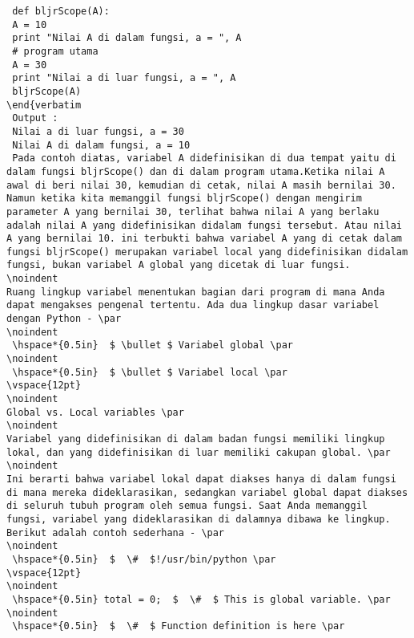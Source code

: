 \begin{verbatim}
 def bljrScope(A):
 A = 10
 print "Nilai A di dalam fungsi, a = ", A
 # program utama
 A = 30
 print "Nilai a di luar fungsi, a = ", A
 bljrScope(A)
\end{verbatim
 Output :
 Nilai a di luar fungsi, a = 30
 Nilai A di dalam fungsi, a = 10
 Pada contoh diatas, variabel A didefinisikan di dua tempat yaitu di dalam fungsi bljrScope() dan di dalam program utama.Ketika nilai A awal di beri nilai 30, kemudian di cetak, nilai A masih bernilai 30. Namun ketika kita memanggil fungsi bljrScope() dengan mengirim parameter A yang bernilai 30, terlihat bahwa nilai A yang berlaku adalah nilai A yang didefinisikan didalam fungsi tersebut. Atau nilai A yang bernilai 10. ini terbukti bahwa variabel A yang di cetak dalam fungsi bljrScope() merupakan variabel local yang didefinisikan didalam fungsi, bukan variabel A global yang dicetak di luar fungsi.  
\noindent 
Ruang lingkup variabel menentukan bagian dari program di mana Anda dapat mengakses pengenal tertentu. Ada dua lingkup dasar variabel dengan Python - \par
\noindent 
 \hspace*{0.5in}  $ \bullet $ Variabel global \par
\noindent 
 \hspace*{0.5in}  $ \bullet $ Variabel local \par
\vspace{12pt}
\noindent 
Global vs. Local variables \par
\noindent 
Variabel yang didefinisikan di dalam badan fungsi memiliki lingkup lokal, dan yang didefinisikan di luar memiliki cakupan global. \par
\noindent 
Ini berarti bahwa variabel lokal dapat diakses hanya di dalam fungsi di mana mereka dideklarasikan, sedangkan variabel global dapat diakses di seluruh tubuh program oleh semua fungsi. Saat Anda memanggil fungsi, variabel yang dideklarasikan di dalamnya dibawa ke lingkup. Berikut adalah contoh sederhana - \par
\noindent 
 \hspace*{0.5in}  $  \#  $!/usr/bin/python \par
\vspace{12pt}
\noindent 
 \hspace*{0.5in} total = 0;  $  \#  $ This is global variable. \par
\noindent 
 \hspace*{0.5in}  $  \#  $ Function definition is here \par

\end{verbatim}
